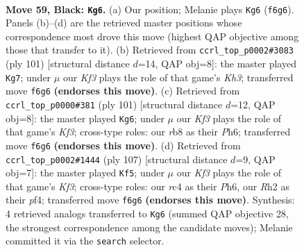 \documentclass[11pt]{article}
\begin{document}
\clearpage

\begin{figure}[p]\centering
\begin{subfigure}{0.46\textwidth}\centering
\resizebox{\linewidth}{!}{%
\newchessgame
\chessboard[
  setfen={1R6/5p2/4pk2/8/P1R1PK2/5P2/7r/8 b - - 10 59},
  showmover=false,
  pgfstyle=straightmove, color=movearrow, markmove={f6-g6}
]}
\caption{}
\end{subfigure}\hfill
\begin{subfigure}{0.46\textwidth}\centering
\resizebox{\linewidth}{!}{%
\newchessgame
\chessboard[
  setfen={8/1r6/6pk/7p/R6P/5PK1/6P1/8 b - - 2 51},
  showmover=false,
  pgfstyle=straightmove, color=movearrow, markmove={h6-g7}
]}
\caption{}
\end{subfigure}
\\[4pt]
\begin{subfigure}{0.46\textwidth}\centering
\resizebox{\linewidth}{!}{%
\newchessgame
\chessboard[
  setfen={8/2r2p2/5k1p/5p2/8/4PK1P/R4P2/8 b - - 0 51},
  showmover=false,
  pgfstyle=straightmove, color=movearrow, markmove={f6-g6}
]}
\caption{}
\end{subfigure}\hfill
\begin{subfigure}{0.46\textwidth}\centering
\resizebox{\linewidth}{!}{%
\newchessgame
\chessboard[
  setfen={2r5/5p2/5kpp/8/5P2/1P1R3P/6PK/8 b - - 1 54},
  showmover=false,
  pgfstyle=straightmove, color=movearrow, markmove={f6-f5}
]}
\caption{}
\end{subfigure}
\caption{\textbf{Move 59, Black: \texttt{Kg6}.} (a) Our position; Melanie plays \texttt{Kg6} (\texttt{f6g6}). Panels (b)--(d) are the retrieved master positions whose correspondence most drove this move (highest QAP objective among those that transfer to it). (b) Retrieved from \texttt{ccrl\_top\_p0002\#3083} (ply 101) [structural distance $d$=14, QAP obj=8]: the master played \texttt{Kg7}; under $\mu$ our \emph{Kf3} plays the role of that game's \emph{Kh3}; transferred move \texttt{f6g6} \textbf{(endorses this move)}. (c) Retrieved from \texttt{ccrl\_top\_p0000\#381} (ply 101) [structural distance $d$=12, QAP obj=8]: the master played \texttt{Kg6}; under $\mu$ our \emph{Kf3} plays the role of that game's \emph{Kf3}; cross-type roles: our \emph{r}b8 as their \emph{P}h6; transferred move \texttt{f6g6} \textbf{(endorses this move)}. (d) Retrieved from \texttt{ccrl\_top\_p0002\#1444} (ply 107) [structural distance $d$=9, QAP obj=7]: the master played \texttt{Kf5}; under $\mu$ our \emph{Kf3} plays the role of that game's \emph{Kf3}; cross-type roles: our \emph{r}c4 as their \emph{P}h6, our \emph{R}h2 as their \emph{p}f4; transferred move \texttt{f6g6} \textbf{(endorses this move)}. Synthesis: 4 retrieved analogs transferred to \texttt{Kg6} (summed QAP objective 28, the strongest correspondence among the candidate moves); Melanie committed it via the \texttt{search} selector.}
\label{fig:thought-m117}
\end{figure}
\end{document}
